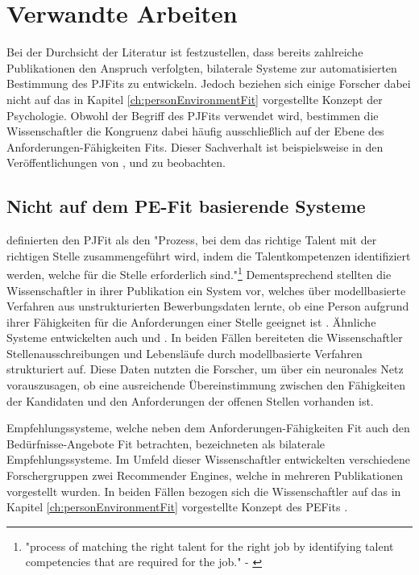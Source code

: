 \chapter{Verwandte Arbeiten}
\label{ch:verwandteArbeiten}
Bei der Durchsicht der Literatur ist festzustellen, dass bereits zahlreiche Publikationen den Anspruch verfolgten, bilaterale Systeme zur automatisierten Bestimmung des \acp{PJFit} zu entwickeln. Jedoch beziehen sich einige Forscher dabei nicht auf das in Kapitel \ref{ch:personEnvironmentFit} vorgestellte Konzept der Psychologie. Obwohl der Begriff des \acp{PJFit} verwendet wird, bestimmen die Wissenschaftler die Kongruenz dabei häufig ausschließlich auf der Ebene des Anforderungen-Fähigkeiten Fits. Dieser Sachverhalt ist beispielsweise in den Veröffentlichungen von \textcite[S. 1ff.]{luo:2019}, \textcite[S. 1ff.]{qin:2018} und \textcite[S. 1ff.]{personJobFit:2018} zu beobachten.

\section{Nicht auf dem PE-Fit basierende Systeme}
\label{ch:verwandteArbeiten:nichtAufDemPEFitBasierend}
\textcite[S. 1, Z. 1f.]{personJobFit:2018} definierten den \ac{PJFit} als den "Prozess, bei dem das richtige Talent mit der richtigen Stelle zusammengeführt wird, indem die Talentkompetenzen identifiziert werden, welche für die Stelle erforderlich sind."\footnote{"process of matching the right talent for the right job by identifying talent competencies that are required for the job." - \textcite[S. 1, Z. 1f.]{personJobFit:2018}} Dementsprechend stellten die Wissenschaftler in ihrer Publikation ein System vor, welches über modellbasierte Verfahren aus unstrukturierten Bewerbungsdaten lernte, ob eine Person aufgrund ihrer Fähigkeiten für die Anforderungen einer Stelle geeignet ist \cite[S. 1ff.]{personJobFit:2018}. Ähnliche Systeme entwickelten auch \textcite[S. 1ff.]{qin:2018} und \textcite[S. 1ff.]{luo:2019}. In beiden Fällen bereiteten die Wissenschaftler Stellenausschreibungen und Lebensläufe durch modellbasierte Verfahren strukturiert auf. Diese Daten nutzten die Forscher, um über ein neuronales Netz vorauszusagen, ob eine ausreichende Übereinstimmung zwischen den Fähigkeiten der Kandidaten und den Anforderungen der offenen Stellen vorhanden ist. 

Empfehlungssysteme, welche neben dem Anforderungen-Fähigkeiten Fit auch den Bedürfnisse-Angebote Fit betrachten, bezeichneten \textcite[S. 4]{malinowski:2006} als bilaterale Empfehlungssysteme. Im Umfeld dieser Wissenschaftler entwickelten verschiedene Forschergruppen zwei Recommender Engines, welche in mehreren Publikationen vorgestellt wurden. In beiden Fällen bezogen sich die Wissenschaftler auf das in Kapitel \ref{ch:personEnvironmentFit} vorgestellte Konzept des \acp{PEFit} \cite[S. 4f.]{keim:2007}\cite[S. 3f.]{keim:2005}\cite[S. 3f.]{malinowski:2005}\cite[S. 3f.]{malinowski:2006}.

